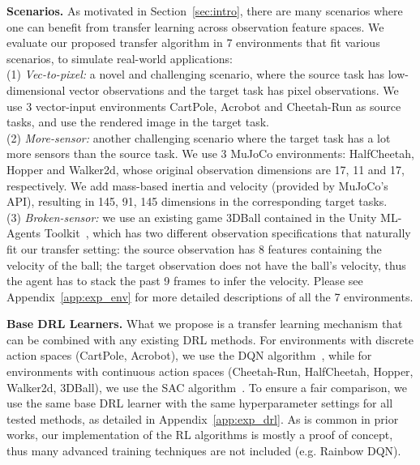 \textbf{Scenarios.}
As motivated in Section~\ref{sec:intro}, there are many scenarios where one can benefit from transfer learning across observation feature spaces. We evaluate our proposed transfer algorithm in 7 environments that fit various scenarios, to simulate real-world applications: \\
(1) \textit{Vec-to-pixel:} a novel and challenging scenario, where the source task has low-dimensional vector observations and the target task has pixel observations. We use 3 vector-input environments CartPole, Acrobot and Cheetah-Run as source tasks, and use the rendered image in the target task. \\
(2) \textit{More-sensor:} another challenging scenario where the target task has a lot more sensors than the source task. We use 3 MuJoCo environments: HalfCheetah, Hopper and Walker2d, whose original observation dimensions are 17, 11 and 17, respectively. We add mass-based inertia and velocity (provided by MuJoCo's API), resulting in 145, 91, 145 dimensions in the corresponding target tasks.  \\
(3) \textit{Broken-sensor:} we use an existing game 3DBall contained in the Unity ML-Agents Toolkit~\citep{juliani2018unity}, which has two different observation specifications that naturally fit our transfer setting: the source observation has 8 features containing the velocity of the ball; the target observation does not have the ball's velocity, thus the agent has to stack the past 9 frames to infer the velocity. Please see Appendix~\ref{app:exp_env} for more detailed descriptions of all the 7 environments.

\textbf{Base DRL Learners.}
What we propose is a transfer learning mechanism that can be combined with any existing DRL methods. For environments with discrete action spaces (CartPole, Acrobot), we use the DQN algorithm~\citep{mnih2015human}, while for environments with continuous action spaces (Cheetah-Run, HalfCheetah, Hopper, Walker2d, 3DBall), we use the SAC algorithm~\citep{haarnoja2018soft}. To ensure a  fair comparison, we use the same base DRL learner with the same hyperparameter settings for all tested methods, as detailed in Appendix~\ref{app:exp_drl}. As is common in prior works, our implementation of the RL algorithms is mostly a proof of concept, thus many advanced training techniques are not included (e.g. Rainbow DQN).

